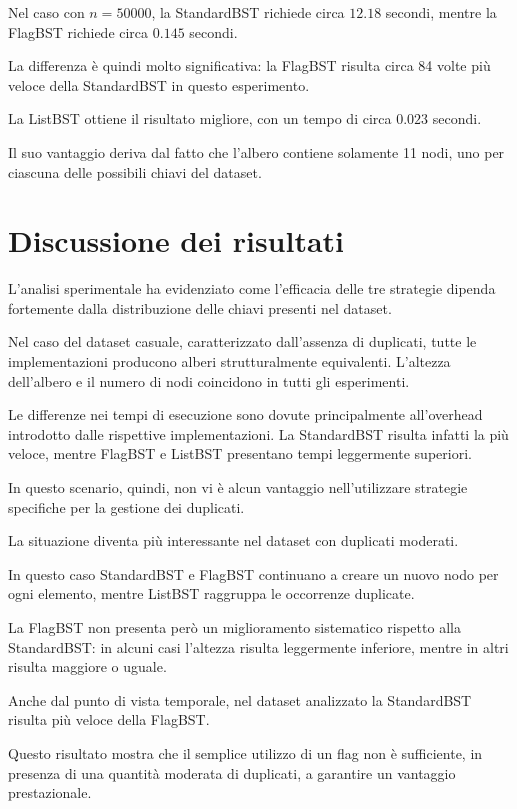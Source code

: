 \documentclass[a4paper,12pt]{article}
\begin{document}
Nel caso con $n=50000$, la StandardBST richiede circa $12.18$ secondi, mentre la FlagBST richiede circa $0.145$ secondi.

La differenza è quindi molto significativa: la FlagBST risulta circa 84 volte più veloce della StandardBST in questo esperimento.

La ListBST ottiene il risultato migliore, con un tempo di circa $0.023$ secondi.

Il suo vantaggio deriva dal fatto che l'albero contiene solamente 11 nodi, uno per ciascuna delle possibili chiavi del dataset.

\clearpage

\section{Discussione dei risultati}

L'analisi sperimentale ha evidenziato come l'efficacia delle tre strategie dipenda fortemente dalla distribuzione delle chiavi presenti nel dataset.

Nel caso del dataset casuale, caratterizzato dall'assenza di duplicati, tutte le implementazioni producono alberi strutturalmente equivalenti. L'altezza dell'albero e il numero di nodi coincidono in tutti gli esperimenti.

Le differenze nei tempi di esecuzione sono dovute principalmente all'overhead introdotto dalle rispettive implementazioni. La StandardBST risulta infatti la più veloce, mentre FlagBST e ListBST presentano tempi leggermente superiori.

In questo scenario, quindi, non vi è alcun vantaggio nell'utilizzare strategie specifiche per la gestione dei duplicati.

La situazione diventa più interessante nel dataset con duplicati moderati.

In questo caso StandardBST e FlagBST continuano a creare un nuovo nodo per ogni elemento, mentre ListBST raggruppa le occorrenze duplicate.

La FlagBST non presenta però un miglioramento sistematico rispetto alla StandardBST: in alcuni casi l'altezza risulta leggermente inferiore, mentre in altri risulta maggiore o uguale.

Anche dal punto di vista temporale, nel dataset analizzato la StandardBST risulta più veloce della FlagBST.

Questo risultato mostra che il semplice utilizzo di un flag non è sufficiente, in presenza di una quantità moderata di duplicati, a garantire un vantaggio prestazionale.
\end{document}
